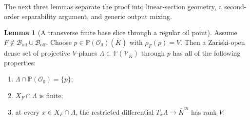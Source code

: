 \documentclass[11pt,a4paper]{article}
\theoremstyle{definition}
\newtheorem{lemma}[theorem]{Lemma}
\theoremstyle{remark}
\newcommand{\PP}{\mathbb P}
\newcommand{\cO}{\mathcal O}
\newcommand{\cB}{\mathcal B}
\newcommand{\cV}{\mathcal V}
\newcommand{\oil}{\mathrm{oil}}
\newcommand{\off}{\mathrm{off}}
\begin{document}
The next three lemmas separate the proof into linear-section geometry, a second-order separability argument, and generic output mixing.

\begin{lemma}[A transverse finite base slice through a regular oil point]\label{lem:linear-section}
Assume $F\notin\cB_{\oil}\cup\cB_{\off}$.  Choose
$p\in\PP(\cO_0)(\overline K)$ with $\rho_F(p)=V$.  Then a Zariski-open dense set of projective $V$-planes $\Lambda\subset\PP(\cV_{\overline K})$ through $p$ has all of the following properties:
\begin{enumerate}
\item $\Lambda\cap\PP(\cO_0)=\{p\}$;
\item $X_F\cap\Lambda$ is finite;
\item at every $x\in X_F\cap\Lambda$, the restricted differential $T_x\Lambda\to\overline K^m$ has rank $V$.
\end{enumerate}
\end{lemma}
\end{document}
